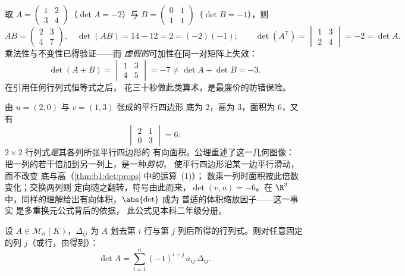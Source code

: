\begin{example}[在数值上验证法则]
\label{ex:b1:det:rulescheck}
取 $A = \begin{pmatrix} 1 & 2\\ 3 & 4\end{pmatrix}$（$\det A =
-2$）与 $B = \begin{pmatrix} 0 & 1\\ 1 & 1\end{pmatrix}$（$\det
B = -1$），则
\[
AB = \begin{pmatrix} 2 & 3\\ 4 & 7\end{pmatrix},
\quad \det(AB) = 14 - 12 = 2 = (-2)(-1) ;
\qquad
\det(A^{\mathsf T}) = \begin{vmatrix} 1 & 3\\ 2 & 4
\end{vmatrix} = -2 = \det A .
\]
乘法性与不变性已得验证——而
\emph{虚假的}可加性在同一对矩阵上失效：
\[
\det(A + B) = \begin{vmatrix} 1 & 3\\ 4 & 5\end{vmatrix} = -7
\neq \det A + \det B = -3 .
\]
在引用任何行列式恒等式之后，
花三十秒做此类算术，是最廉价的防错保险。
\end{example}

\begin{example}[行列式作为面积]
\label{ex:b1:det:area}
由 $u = (2, 0)$ 与 $v = (1, 3)$ 张成的平行四边形
底为 $2$，高为 $3$，面积为 $6$，又有
\[
\begin{vmatrix} 2 & 1\\ 0 & 3\end{vmatrix} = 6 :
\]
$2\times2$ 行列式\emph{是}其各列所张平行四边形的
有向面积。公理重述了这一几何图像：
把一列的若干倍加到另一列上，是一种\emph{剪切}，
使平行四边形沿某一边平行滑动，而不改变
底与高（\cref{thm:b1:det:props} 中的运算~(1)）；
数乘一列时面积按此倍数变化；交换两列则
定向随之翻转，符号由此而来，$\det(v, u) = -6$。在 $\R^3$
中，同样的理解给出有向体积，$\abs{\det}$ 成为
普适的体积缩放因子——这一事实
是多重换元公式背后的依据，
此公式见本科二年级分册。
\end{example}

\begin{theorem}[余子式展开]\label{thm:b1:det:cofactor}
设 $A \in \mathcal{M}_n(K)$，$\Delta_{ij}$ 为
$A$ 划去第 $i$ 行与第 $j$ 列后所得的行列式。则对任意固定的列
$j$（或行，由得到）：
\[
\det A = \sum_{i=1}^{n} (-1)^{i+j}\, a_{ij}\, \Delta_{ij} .
\]
\end{theorem}
\admitted

